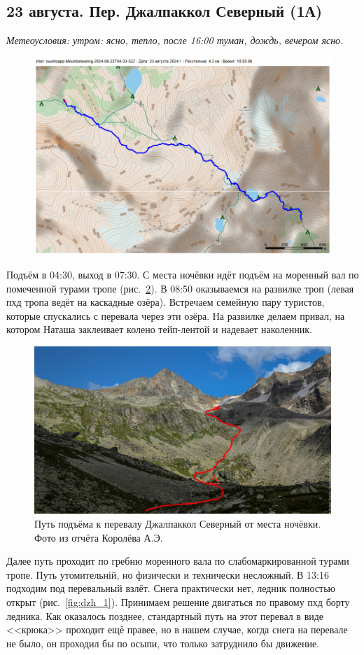 \subsection{23 августа.  Пер. Джалпаккол Северный (1А)}
\textit{Метеоусловия: утром: ясно, тепло, после 16:00 туман, дождь, вечером ясно.}

\begin{figure}[h!]
	\centering
	\includegraphics[angle=0, width=0.7\linewidth]{../pics/mini_maps/23}
	\label{fig:mini_23}
\end{figure}


Подъём в 04:30, выход в 07:30. С места ночёвки идёт подъём на моренный вал по помеченной турами тропе (рис.~\ref{fig:23augstart}). В 08:50 оказываемся на развилке троп (левая пхд тропа ведёт на каскадные озёра). Встречаем семейную пару туристов, которые спускались с перевала через эти озёра. На развилке делаем привал, на котором Наташа заклеивает колено тейп-лентой и надевает наколенник.

\begin{figure}[h!]
	\centering
	\includegraphics[angle=0, width=0.7\linewidth]{../pics/23augstart}
	\caption{Путь подъёма к перевалу Джалпаккол Северный от места ночёвки. Фото из отчёта Королёва А.Э. \cite{Korolyov2018}}
	\label{fig:23augstart}
\end{figure}

 Далее путь проходит по гребню моренного вала по слабомаркированной турами тропе. Путь утомительній, но физически и технически несложный. В 13:16 подходим под перевальный взлёт. Снега практически нет, ледник полностью открыт (рис.~\ref{fig:dzh_1}). Принимаем решение двигаться по правому пхд борту ледника. Как оказалось позднее, стандартный путь на этот перевал в виде <<крюка>> проходит ещё правее, но в нашем случае, когда снега на перевале не было, он проходил бы по осыпи, что только затруднило бы движение.
 



